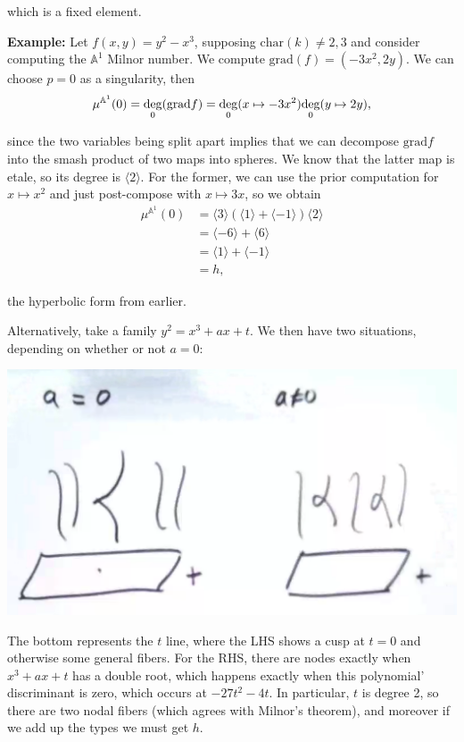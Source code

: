 \documentclass[11pt]{scrreprt}
\theoremstyle{definition}
\newcommand{\Af}[0]{{\mathbb{A}}}
\newcommand{\grad}[0]{\mathrm{grad}}
\newcommand{\generators}[1]{\langle{#1}\rangle}
\renewcommand{\char}[0]{\text{char}}
\begin{document}
which is a fixed element.

\textbf{Example:} Let \(f(x,y) = y^2-x^3\), supposing
\(\char(k) \neq 2,3\) and consider computing the \(\Af^1\) Milnor
number. We compute \(\grad(f) = (-3x^2, 2y)\). We can choose \(p=0\) as
a singularity, then \[
\mu^{\Af^1}(0) = \underset 0 \deg(\grad f) \\
= \underset 0 \deg(x\mapsto -3x^2) \underset 0 \deg(y\mapsto 2y),
\]

since the two variables being split apart implies that we can decompose
\(\grad f\) into the smash product of two maps into spheres. We know
that the latter map is etale, so its degree is \(\generators{2}\). For
the former, we can use the prior computation for \(x\mapsto x^2\) and
just post-compose with \(x\mapsto 3x\), so we obtain \begin{align*}
\mu^{\Af^1}(0) &= \generators{3}(\generators{1} + \generators{-1}) \generators{2} \\
&= \generators{-6} + \generators{6}\\
&= \generators{1} + \generators{-1}\\
&= h,
\end{align*}

the hyperbolic form from earlier.

Alternatively, take a family \(y^2 = x^3 + ax + t\). We then have two
situations, depending on whether or not \(a=0\):

\begin{center}
\includegraphics{../assets/2019-03-09-12-44-39.png}
\end{center}

The bottom represents the \(t\) line, where the LHS shows a cusp at
\(t=0\) and otherwise some general fibers. For the RHS, there are nodes
exactly when \(x^3+ax+t\) has a double root, which happens exactly when
this polynomial' discriminant is zero, which occurs at \(-27t^2-4t\). In
particular, \(t\) is degree 2, so there are two nodal fibers (which
agrees with Milnor's theorem), and moreover if we add up the types we
must get \(h\).
\end{document}
